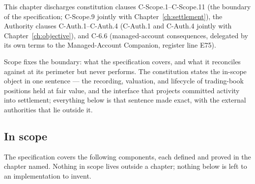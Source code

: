 \documentclass[11pt,a4paper]{article}
\begin{document}
This chapter discharges constitution clauses C-Scope.1--C-Scope.11 (the boundary of the specification; C-Scope.9 jointly with Chapter~\ref{ch:settlement}), the Authority clauses C-Auth.1--C-Auth.4 (C-Auth.1 and C-Auth.4 jointly with Chapter~\ref{ch:objective}), and C-6.6 (managed-account consequences, delegated by its own terms to the Managed-Account Companion, register line E75).

Scope fixes the boundary: what the specification covers, and what it reconciles against
at its perimeter but never performs. The constitution states the in-scope object in one
sentence --- the recording, valuation, and lifecycle of trading-book positions held at
fair value, and the interface that projects committed activity into settlement; everything
below is that sentence made exact, with the external authorities that lie outside it.

\subsection{In scope}

The specification covers the following components, each defined and proved in the chapter
named. Nothing in scope lives outside a chapter; nothing below is left to an implementation
to invent.
\end{document}
